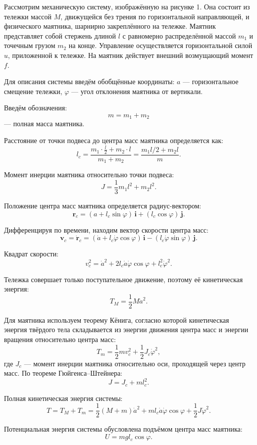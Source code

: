 \documentclass[a4paper,12pt]{article}
\begin{document}
Рассмотрим механическую систему, изображённую на рисунке 1. Она состоит из тележки массой \(M\), движущейся без трения по горизонтальной направляющей, и физического маятника, шарнирно закреплённого на тележке. Маятник представляет собой стержень длиной \(l\) с равномерно распределённой массой \(m_1\) и точечным грузом \(m_2\) на конце. Управление осуществляется горизонтальной силой \(u\), приложенной к тележке. На маятник действует внешний возмущающий момент \(f\).

Для описания системы введём обобщённые координаты: \(a\) — горизонтальное смещение тележки, \(\varphi\) — угол отклонения маятника от вертикали.

Введём обозначения:
\[
m = m_1 + m_2
\]
— полная масса маятника.

Расстояние от точки подвеса до центра масс маятника определяется как:
\[
l_c = \frac{m_1 \cdot \frac{l}{2} + m_2 \cdot l}{m_1 + m_2} = \frac{m_1 l / 2 + m_2 l}{m}.
\]

Момент инерции маятника относительно точки подвеса:
\[
J = \frac{1}{3}m_1 l^2 + m_2 l^2.
\]

Положение центра масс маятника определяется радиус-вектором:
\[
\mathbf{r}_c = (a + l_c \sin\varphi)\,\mathbf{i} + (l_c \cos\varphi)\,\mathbf{j}.
\]

Дифференцируя по времени, находим вектор скорости центра масс:
\[
\mathbf{v}_c = \dot{\mathbf{r}}_c = 
(\dot{a} + l_c\dot{\varphi}\cos\varphi)\,\mathbf{i} - (l_c\dot{\varphi}\sin\varphi)\,\mathbf{j}.
\]

Квадрат скорости:
\[
v_c^2 = \dot{a}^2 + 2l_c\dot{a}\dot{\varphi}\cos\varphi + l_c^2\dot{\varphi}^2.
\]

Тележка совершает только поступательное движение, поэтому её кинетическая энергия:
\[
T_M = \frac{1}{2}M\dot{a}^2.
\]

Для маятника используем теорему Кёнига, согласно которой кинетическая энергия твёрдого тела складывается из энергии движения центра масс и энергии вращения относительно центра масс:
\[
T_m = \frac{1}{2}m v_c^2 + \frac{1}{2}J_c\dot{\varphi}^2,
\]
где \(J_c\) — момент инерции маятника относительно оси, проходящей через центр масс. По теореме Гюйгенса--Штейнера:
\[
J = J_c + m l_c^2.
\]

Полная кинетическая энергия системы:
\[
T = T_M + T_m = 
\frac{1}{2}(M+m)\dot{a}^2 + m l_c \dot{a}\dot{\varphi}\cos\varphi + 
\frac{1}{2}J\dot{\varphi}^2. \tag{1}
\]

Потенциальная энергия системы обусловлена подъёмом центра масс маятника:
\[
U = m g l_c \cos\varphi. \tag{2}
\]
\end{document}
